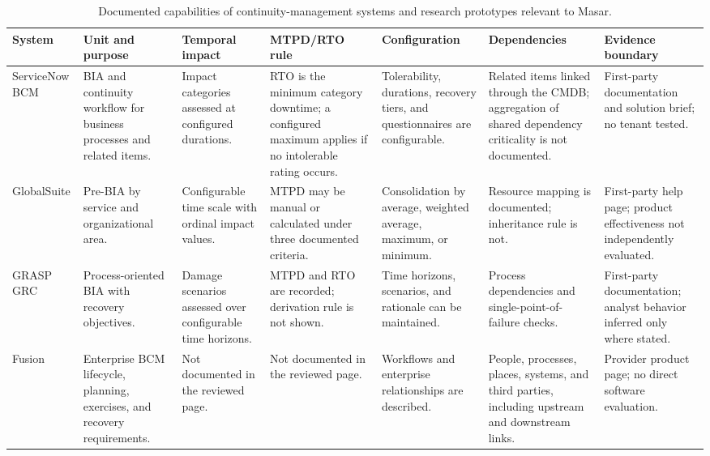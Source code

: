 \begin{table}
\centering
\caption{Documented capabilities of continuity-management systems and research prototypes relevant to Masar.}
\label{tab:lr_systems}
\footnotesize
\renewcommand{\arraystretch}{1.15}
\setlength{\tabcolsep}{4pt}
\begin{tabularx}{\linewidth}{>{\raggedright\arraybackslash}p{2.5cm} >{\raggedright\arraybackslash}X >{\raggedright\arraybackslash}X >{\raggedright\arraybackslash}X >{\raggedright\arraybackslash}X >{\raggedright\arraybackslash}X >{\raggedright\arraybackslash}X}
\toprule
\textbf{System} & \textbf{Unit and purpose} & \textbf{Temporal impact} & \textbf{MTPD/RTO rule} & \textbf{Configuration} & \textbf{Dependencies} & \textbf{Evidence boundary} \\
\midrule
ServiceNow BCM \cite{servicenow2025bia,servicenow2025rto,servicenow2025datasheet} & BIA and continuity workflow for business processes and related items. & Impact categories assessed at configured durations. & RTO is the minimum category downtime; a configured maximum applies if no intolerable rating occurs. & Tolerability, durations, recovery tiers, and questionnaires are configurable. & Related items linked through the CMDB; aggregation of shared dependency criticality is not documented. & First-party documentation and solution brief; no tenant tested. \\
GlobalSuite \cite{globalsuite2025prebia} & Pre-BIA by service and organizational area. & Configurable time scale with ordinal impact values. & MTPD may be manual or calculated under three documented criteria. & Consolidation by average, weighted average, maximum, or minimum. & Resource mapping is documented; inheritance rule is not. & First-party help page; product effectiveness not independently evaluated. \\
GRASP GRC \cite{grasp2025bia} & Process-oriented BIA with recovery objectives. & Damage scenarios assessed over configurable time horizons. & MTPD and RTO are recorded; derivation rule is not shown. & Time horizons, scenarios, and rationale can be maintained. & Process dependencies and single-point-of-failure checks. & First-party documentation; analyst behavior inferred only where stated. \\
Fusion \cite{fusion2026bcm} & Enterprise BCM lifecycle, planning, exercises, and recovery requirements. & Not documented in the reviewed page. & Not documented in the reviewed page. & Workflows and enterprise relationships are described. & People, processes, places, systems, and third parties, including upstream and downstream links. & Provider product page; no direct software evaluation. \\

\end{tabularx}
\end{table}
